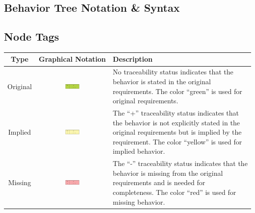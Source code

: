 \documentclass[]{article}
\begin{document}
\begin{landscape}
\section{Behavior Tree Notation \& Syntax}

\subsection{Node Tags}

\singlespacing
\begin{center}
\begin{longtable}[c]{|c|c|p{12cm}|}
\hline
\textbf{Type} & \textbf{Graphical Notation} & \textbf{Description} \\
\hline
\hline
 \multirow{3}{*}{Original} & \multirow{3}{*}{\includegraphics[width=0.23\textwidth]{figs/AppendixB/Tags/Original.pdf}} & \multirow{3}{12cm}{No traceability status indicates that the behavior is stated in the original requirements. The color ``green'' is used for original requirements.} \\*
 &&\\
 &&\\
 \hline
 \multirow{3}{*}{Implied} &  \multirow{3}{*}{\includegraphics[width=0.23\textwidth]{figs/AppendixB/Tags/Implied.pdf}} & \multirow{3}{12cm}{The ``+'' traceability status indicates that the behavior is not explicitly stated in the original requirements but is implied by the requirement. The color ``yellow'' is used for implied behavior.} \\*
 &&\\
 &&\\
 \hline
 \multirow{3}{*}{Missing} & \multirow{3}{*}{\includegraphics[width=0.23\textwidth]{figs/AppendixB/Tags/Missing.pdf}}  & \multirow{3}{12cm}{The ``-'' traceability status indicates that the behavior is missing from the original requirements and is needed for completeness. The color ``red'' is used for missing behavior.}\\*
 &&\\

\end{longtable}
\end{center}
\end{landscape}
\end{document}
